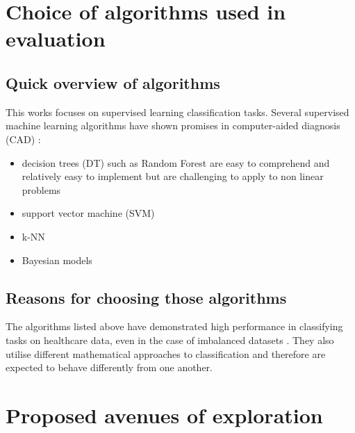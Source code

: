 \section{Choice of algorithms used in evaluation}
\subsection{Quick overview of algorithms}
This works focuses on supervised learning classification tasks. Several supervised machine learning algorithms have shown promises in computer-aided diagnosis (CAD) \citep{Dua:2014dz}:
\begin{itemize}
    \item decision trees (DT) such as Random Forest are easy to comprehend and relatively easy to implement but are challenging to apply to non linear problems \citep{Gray:2013eh}
    \item support vector machine (SVM) \citep{Naraei:ct}
    \item k-NN \citep{Liu:2011dz}
    \item Bayesian models \citep{Dangare:ut}
\end{itemize}

\subsection{Reasons for choosing those algorithms}
The algorithms listed above have demonstrated high performance in classifying tasks on healthcare data, even in the case of imbalanced datasets \citep{Dua:2014dz}. They also utilise different mathematical approaches to classification and therefore are expected to behave differently from one another.



\section{Proposed avenues of exploration}
